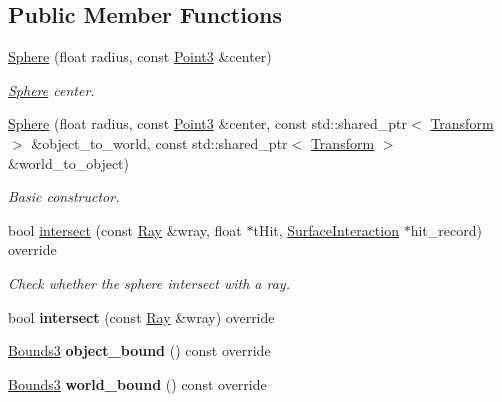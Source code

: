 \subsection*{Public Member Functions}
\begin{DoxyCompactItemize}
\item 
\mbox{\hyperlink{classomg_1_1_sphere_a81f9a5180b9c883ce00669d4af4d38db}{Sphere}} (float radius, const \mbox{\hyperlink{namespaceomg_af85242d35fdacf829d32a6f9b95f3e35}{Point3}} \&center)
\begin{DoxyCompactList}\small\item\em \mbox{\hyperlink{classomg_1_1_sphere}{Sphere}} center. \end{DoxyCompactList}\item 
\mbox{\label{classomg_1_1_sphere_a156fe48691f107d7a04774bdc640959e}} 
\mbox{\hyperlink{classomg_1_1_sphere_a156fe48691f107d7a04774bdc640959e}{Sphere}} (float radius, const \mbox{\hyperlink{namespaceomg_af85242d35fdacf829d32a6f9b95f3e35}{Point3}} \&center, const std\+::shared\+\_\+ptr$<$ \mbox{\hyperlink{classomg_1_1_transform}{Transform}} $>$ \&object\+\_\+to\+\_\+world, const std\+::shared\+\_\+ptr$<$ \mbox{\hyperlink{classomg_1_1_transform}{Transform}} $>$ \&world\+\_\+to\+\_\+object)
\begin{DoxyCompactList}\small\item\em Basic constructor. \end{DoxyCompactList}\item 
\mbox{\label{classomg_1_1_sphere_a707391273156f6f28f869fc3f1cb6aaa}} 
bool \mbox{\hyperlink{classomg_1_1_sphere_a707391273156f6f28f869fc3f1cb6aaa}{intersect}} (const \mbox{\hyperlink{classomg_1_1_ray}{Ray}} \&wray, float $\ast$t\+Hit, \mbox{\hyperlink{classomg_1_1_surface_interaction}{Surface\+Interaction}} $\ast$hit\+\_\+record) override
\begin{DoxyCompactList}\small\item\em Check whether the sphere intersect with a ray. \end{DoxyCompactList}\item 
\mbox{\label{classomg_1_1_sphere_aa0c835cd36b4e462d47747c1b65d851a}} 
bool {\bfseries intersect} (const \mbox{\hyperlink{classomg_1_1_ray}{Ray}} \&wray) override
\item 
\mbox{\label{classomg_1_1_sphere_a1917eefd9b7c2104c2cf80346b053467}} 
\mbox{\hyperlink{classomg_1_1_bounds3}{Bounds3}} {\bfseries object\+\_\+bound} () const override
\item 
\mbox{\label{classomg_1_1_sphere_af504ff473cf420a9a52b21cbea6de10b}} 
\mbox{\hyperlink{classomg_1_1_bounds3}{Bounds3}} {\bfseries world\+\_\+bound} () const override
\end{DoxyCompactItemize}
